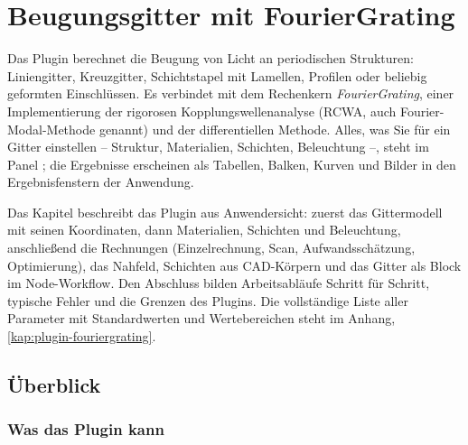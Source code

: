 \chapter{Beugungsgitter mit FourierGrating}\label{kap:fouriergrating}

Das Plugin  berechnet die Beugung von Licht an periodischen Strukturen:
Liniengitter, Kreuzgitter, Schichtstapel mit Lamellen, Profilen oder beliebig geformten
Einschlüssen. Es verbindet \produkt{} mit dem Rechenkern \emph{FourierGrating}, einer
Implementierung der rigorosen Kopplungswellenanalyse (RCWA, auch Fourier-Modal-Methode genannt)
und der differentiellen Methode. Alles, was Sie für ein Gitter einstellen -- Struktur,
Materialien, Schichten, Beleuchtung --, steht im Panel ; die Ergebnisse erscheinen als
Tabellen, Balken, Kurven und Bilder in den Ergebnisfenstern der Anwendung.

Das Kapitel beschreibt das Plugin aus Anwendersicht: zuerst das Gittermodell mit seinen
Koordinaten, dann Materialien, Schichten und Beleuchtung, anschließend die Rechnungen (Einzelrechnung,
Scan, Aufwandsschätzung, Optimierung), das Nahfeld, Schichten aus CAD-Körpern und das Gitter als Block
im Node-Workflow. Den Abschluss bilden Arbeitsabläufe Schritt für Schritt, typische Fehler und die
Grenzen des Plugins. Die vollständige Liste aller Parameter mit Standardwerten und Wertebereichen
steht im Anhang, \autoref{kap:plugin-fouriergrating}.

\section{Überblick}\label{sec:fg-ueberblick}

\subsection{Was das Plugin kann}

